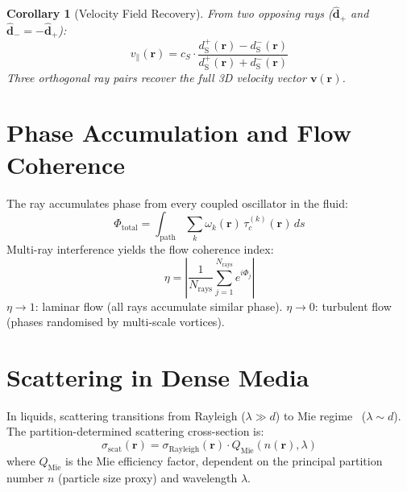 \documentclass[twocolumn,10pt,a4paper]{article}
\theoremstyle{plain}
\newtheorem{corollary}[theorem]{Corollary}
\theoremstyle{definition}
\theoremstyle{remark}
\newcommand{\tauc}{\tau_c}
\newcommand{\dS}{d_{\mathrm{S}}}
\begin{document}
\begin{corollary}[Velocity Field Recovery]
From two opposing rays ($\hat{\mathbf{d}}_+$ and $\hat{\mathbf{d}}_- = -\hat{\mathbf{d}}_+$):
\begin{equation}
    v_\parallel(\mathbf{r}) = c_S \cdot \frac{\dS^+(\mathbf{r}) - \dS^-(\mathbf{r})}{\dS^+(\mathbf{r}) + \dS^-(\mathbf{r})}
\end{equation}
Three orthogonal ray pairs recover the full 3D velocity vector $\mathbf{v}(\mathbf{r})$.
\end{corollary}

\section{Phase Accumulation and Flow Coherence}
\label{sec:coherence}

The ray accumulates phase from every coupled oscillator in the fluid:
\begin{equation}
    \Phi_{\mathrm{total}} = \int_{\mathrm{path}} \sum_k \omega_k(\mathbf{r})\, \tauc^{(k)}(\mathbf{r})\, ds
\end{equation}
Multi-ray interference yields the flow coherence index:
\begin{equation}
    \eta = \left|\frac{1}{N_{\mathrm{rays}}} \sum_{j=1}^{N_{\mathrm{rays}}} e^{i\Phi_j}\right|
\end{equation}
$\eta \to 1$: laminar flow (all rays accumulate similar phase). $\eta \to 0$: turbulent flow (phases randomised by multi-scale vortices).

\section{Scattering in Dense Media}
\label{sec:scattering}

In liquids, scattering transitions from Rayleigh ($\lambda \gg d$) to Mie regime~\cite{mie1908} ($\lambda \sim d$). The partition-determined scattering cross-section is:
\begin{equation}
    \sigma_{\mathrm{scat}}(\mathbf{r}) = \sigma_{\mathrm{Rayleigh}}(\mathbf{r}) \cdot Q_{\mathrm{Mie}}(n(\mathbf{r}), \lambda)
\end{equation}
where $Q_{\mathrm{Mie}}$ is the Mie efficiency factor, dependent on the principal partition number $n$ (particle size proxy) and wavelength $\lambda$.
\end{document}
